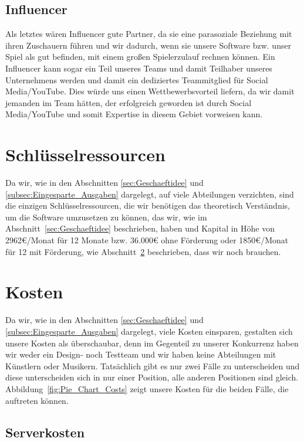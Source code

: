 \documentclass[fontsize=11, a4aper]{scrartcl}
\begin{document}
\subsection{Influencer} \label{subsec:Influencer}

Als letztes wären Influencer gute Partner, da sie eine parasoziale Beziehung mit ihren Zuschauern führen und wir dadurch, wenn sie unsere Software bzw. unser Spiel als gut befinden, mit einem großen Spielerzulauf rechnen können. Ein Influencer kann sogar ein Teil unseres Teams und damit Teilhaber unseres Unternehmens werden und damit ein dediziertes Teammitglied für Social Media/YouTube. Dies würde uns einen Wettbewerbsvorteil liefern, da wir damit jemanden im Team hätten, der erfolgreich geworden ist durch Social Media/YouTube und somit Expertise in diesem Gebiet vorweisen kann.

\section{Schlüsselressourcen} \label{sec:Ressourcen}

Da wir, wie in den Abschnitten \ref{sec:Geschaeftidee} und \ref{subsec:Eingesparte_Ausgaben} dargelegt, auf viele Abteilungen verzichten, sind die einzigen Schlüsselressourcen, die wir benötigen das theoretisch Verständnis, um die Software umzusetzen zu können, das wir, wie im Abschnitt~\ref{sec:Geschaeftidee} beschrieben, haben und Kapital in Höhe von 2962€/Monat für 12 Monate bzw. 36.000€ ohne Förderung oder 1850€/Monat für 12 mit Förderung, wie Abschnitt~\ref{sec:Kosten} beschrieben, dass wir noch brauchen.

\section{Kosten} \label{sec:Kosten}

Da wir, wie in den Abschnitten \ref{sec:Geschaeftidee} und \ref{subsec:Eingesparte_Ausgaben} dargelegt, viele Kosten einsparen, gestalten sich unsere Kosten als überschaubar, denn im Gegenteil zu unserer Konkurrenz haben wir weder ein Design- noch Testteam und wir haben keine Abteilungen mit Künstlern oder Musikern. Tatsächlich gibt es nur zwei Fälle zu unterscheiden und diese unterscheiden sich in nur einer Position, alle anderen Positionen sind gleich. Abbildung~\ref{fig:Pie_Chart_Costs} zeigt unsere Kosten für die beiden Fälle, die auftreten können.


\subsection{Serverkosten} \label{subsec:Serverkosten}
\end{document}
